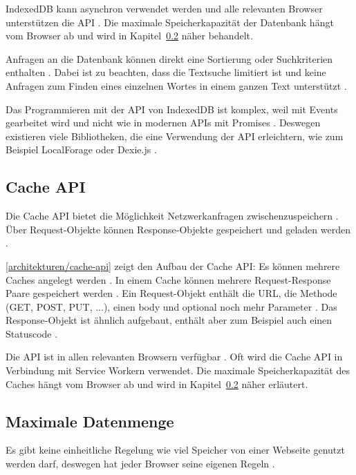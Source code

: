 
IndexedDB kann asynchron verwendet werden \autocite{Hajian2019} \autocite{mdn-indexeddb} und alle relevanten Browser unterstützen die \ac{API} \autocite{mdn-indexeddb-api}. Die maximale Speicherkapazität der Datenbank hängt vom Browser ab und wird in Kapitel~\ref{Kap4:Datenmenge} näher behandelt.

Anfragen an die Datenbank können direkt eine Sortierung oder Suchkriterien enthalten \autocite{mdn-indexeddb}. Dabei ist zu beachten, dass die Textsuche limitiert ist und keine Anfragen zum Finden eines einzelnen Wortes in einem ganzen Text unterstützt \autocite{mdn-indexeddb}. 

Das Programmieren mit der \ac{API} von IndexedDB ist komplex, weil mit Events gearbeitet wird und nicht wie in modernen \acp{API} mit Promises \autocite{Hajian2019}. Deswegen existieren viele Bibliotheken, die eine Verwendung der \ac{API} erleichtern, wie zum Beispiel LocalForage oder Dexie.js \autocite{Hajian2019} \autocite{mdn-indexeddb}.

\subsection{Cache API}
Die Cache \ac{API} bietet die Möglichkeit Netzwerkanfragen zwischenzuspeichern \autocite{mdn-cache-api}. Über Request-Objekte können Response-Objekte gespeichert und geladen werden \autocite{mdn-cache-api}.


\autoref{architekturen/cache-api} zeigt den Aufbau der Cache \ac{API}: Es können mehrere Caches angelegt werden \autocite{mdn-cache-api}. In einem Cache können mehrere Request-Response Paare gespeichert werden \autocite{mdn-cache-api}. Ein Request-Objekt enthält die URL, die Methode (GET, POST, PUT, ...), einen body und optional noch mehr Parameter \autocite{mdn-request}. Das Response-Objekt ist ähnlich aufgebaut, enthält aber zum Beispiel auch einen Statuscode \autocite{mdn-response}.

Die \ac{API} ist in allen relevanten Browsern verfügbar \autocite{mdn-cache-api}. Oft wird die Cache \ac{API} in Verbindung mit Service Workern verwendet. Die maximale Speicherkapazität des Caches hängt vom Browser ab und wird in Kapitel~\ref{Kap4:Datenmenge} näher erläutert. 

\subsection{Maximale Datenmenge}
\label{Kap4:Datenmenge}
Es gibt keine einheitliche Regelung wie viel Speicher von einer Webseite genutzt werden darf, deswegen hat jeder Browser seine eigenen Regeln \autocite{storage-for-the-web}. 

